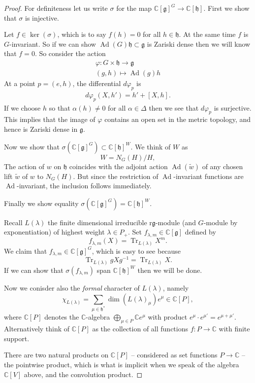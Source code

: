 \documentclass[12pt]{article}
\theoremstyle{plain}
\theoremstyle{definition}
\numberwithin{equation}{section}
\DeclareMathOperator{\Ad}{Ad}
\DeclareMathOperator{\tr}{Tr}
\newcommand{\wtil}[1]{\widetilde{#1}}
\newcommand{\al}{\alpha}
\newcommand{\la}{\lambda}
\newcommand{\D}{\Delta}
\newcommand{\C}{\mathbb{C}}
\newcommand{\g}{\mathfrak{g}}
\newcommand{\h}{\mathfrak{h}}
\begin{document}
\begin{proof}
For definiteness let us write $\sigma$ for the map $\C[\g]^G \rightarrow \C[\h]$. First we show that $\sigma$ is injective.

Let $f \in \ker(\sigma)$, which is to say $f(h) = 0$ for all $h \in \h$. At the same time $f$ is $G$-invariant. So if we can show $\Ad(G) \h \subset \g$ is Zariski dense then we will know that $f = 0$. So consider the action
\begin{align*}
\varphi : G \times \h \rightarrow \g \\
%
(g, h) \mapsto \Ad(g)h
\end{align*}
At a point $p = (e, h)$, the differential $d\varphi_p$ is
\begin{align*}
d\varphi_p(X, h') = h' + [X, h].
\end{align*}
If we choose $h$ so that $\al(h) \neq 0$ for all $\alpha \in \D$ then we see that $d\varphi_p$ is surjective. This implies that the image of $\varphi$ contains an open set in the metric topology, and hence is Zariski dense in $\g$.

Now we show that $\sigma(\C[\g]^G) \subset \C[\h]^W$. We think of $W$ as
\[
W = N_G(H) / H,
\]
The action of $w$ on $\h$ coincides with the adjoint action $\Ad(\wtil{w})$ of any chosen lift $\wtil{w}$ of $w$ to $N_G(H)$. But since the restriction of $\Ad$-invariant functions are $\Ad$-invariant, the inclusion follows immediately.


Finally we show equality $\sigma(\C[\g]^G) = \C[\h]^W$.

Recall $L(\lambda)$ the finite dimensional irreducible r$\g$-module (and $G$-module by exponentiation) of highest weight $\la \in P_+$. Set $f_{\la, m} \in \C[\g]$ defined by
\[
f_{\la, m}(X) = \tr_{L(\la)} X^m.
\]
We claim that $f_{\la, m} \in \C[\g]^G$, which is easy to see because
\[
\tr_{L(\la)} g X g^{-1} =  \tr_{L(\la)} X.
\]
If we can show that $\sigma(f_{\la, m})$ span $\C[\h]^W$ then we will be done.

Now we conisder also the \emph{formal} character of $L(\la)$, namely
\[
\chi_{L(\la)} = \sum_{\mu \in \h^*} \dim(L(\la)_\mu) e^\mu \in \C[P],
\]
where $\C[P]$ denotes the $\C$-algebra $\bigoplus_{\mu \in P} \C e^\mu$ with product $e^\mu \cdot e^{\mu'} = e^{\mu + \mu'}$. Alternatively think of $\C[P]$ as the collection of all functions $f : P \rightarrow \C$ with finite support.

{\color{red}There are two natural products on $\C[P]$ -- considered as set functions $P \rightarrow \C$ -- the pointwise product, which is what is implicit when we speak of the algebra $\C[V]$ above, and the convolution product.}


\end{proof}
\end{document}
